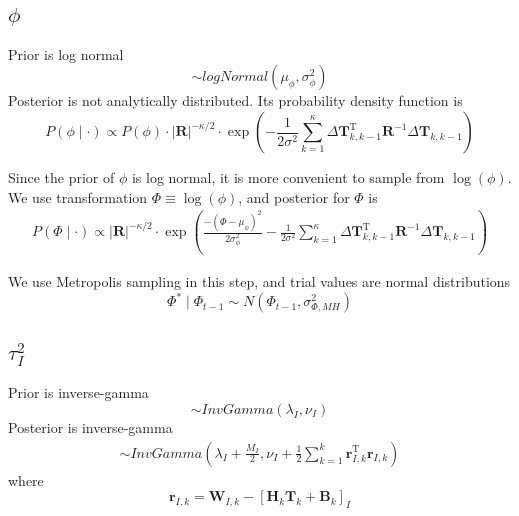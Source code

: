 \documentclass[12pt, letterpaper]{article}
\begin{document}
\subsection{$\phi$}
Prior is log normal
\begin{equation}
	\sim logNormal\left(\mu_{\phi}, \sigma_{\phi}^{2}\right)
\end{equation}
Posterior is not analytically distributed. Its probability density function is 
\begin{equation}
P(\phi \mid \cdot) \propto P(\phi) \cdot|\mathbf{R}|^{-\kappa / 2} \cdot \exp \left(-\frac{1}{2 \sigma^{2}} \sum_{k=1}^{\kappa} \Delta \mathbf{T}_{k, k-1}^{\mathrm{T}} \mathbf{R}^{-1} \Delta \mathbf{T}_{k, k-1}\right)
\end{equation}

Since the prior of $\phi$ is log normal, it is more convenient to sample from $\log(\phi)$. We use transformation $\Phi \equiv \log(\phi)$, and posterior for $\Phi$ is
\begin{align}
P(\Phi \mid \cdot) \propto|\mathbf{R}|^{-\kappa / 2} \cdot  \exp \left(\frac{-\left(\Phi-\mu_{\phi}\right)^{2}}{2 \sigma_{\phi}^{2}}-\frac{1}{2 \sigma^{2}} \sum_{k=1}^{\kappa} \Delta \mathbf{T}_{k, k-1}^{\mathrm{T}} \mathbf{R}^{-1} \Delta \mathbf{T}_{k, k-1}\right)
\end{align}

We use Metropolis sampling in this step, and trial values are normal distributions
\begin{equation}
\Phi^{*} \mid \Phi_{t-1} \sim N\left(\Phi_{t-1}, \sigma_{\Phi, M H}^{2}\right)
\end{equation}

\subsection{$\tau_I^2$}
Prior is inverse-gamma
\begin{equation}
	\sim InvGamma \left(\lambda_{I}, \nu_{I}\right)
\end{equation}
Posterior is inverse-gamma
\begin{align}
\sim  InvGamma \left(\lambda_{I}+\frac{M_{I}}{2}, \nu_{I}+\frac{1}{2} \sum_{k=1}^{k} \mathbf{r}_{I, k}^{\mathrm{T}} \mathbf{r}_{I, k}\right)
\end{align}
where
\begin{equation}
\mathbf{r}_{I, k}=\mathbf{W}_{I, k}-\left[\mathbf{H}_{k} \mathbf{T}_{k}+\mathbf{B}_{k}\right]_{I}
\end{equation}
\end{document}
